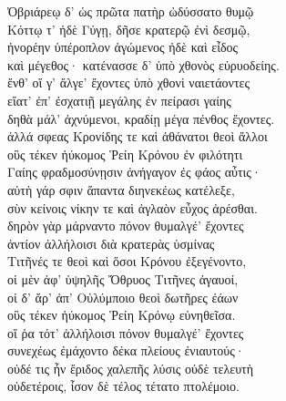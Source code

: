 \begin{pages}
\begin{Leftside}
\smallskip
\begin{center}\end{center}
\smallskip

Ὀβριάρεῳ δ' ὡς πρῶτα πατὴρ ὠδύσσατο θυμῷ \\
Κόττῳ τ' ἠδὲ Γύγῃ, δῆσε κρατερῷ ἐνὶ δεσμῷ, \\
ἠνορέην ὑπέροπλον ἀγώμενος ἠδὲ καὶ εἶδος\\
καὶ μέγεθος· κατένασσε δ' ὑπὸ χθονὸς εὐρυοδείης.  \\
ἔνθ' οἵ γ' ἄλγε' ἔχοντες ὑπὸ χθονὶ ναιετάοντες\\
εἵατ' ἐπ' ἐσχατιῇ μεγάλης ἐν πείρασι γαίης \\
δηθὰ μάλ' ἀχνύμενοι, κραδίῃ μέγα πένθος ἔχοντες.\\
ἀλλά σφεας Κρονίδης τε καὶ ἀθάνατοι θεοὶ ἄλλοι \\
οὓς τέκεν ἠύκομος Ῥείη Κρόνου ἐν φιλότητι  \\
Γαίης φραδμοσύνῃσιν ἀνήγαγον ἐς φάος αὖτις· \\
αὐτὴ γάρ σφιν ἅπαντα διηνεκέως κατέλεξε, \\
σὺν κείνοις νίκην τε καὶ ἀγλαὸν εὖχος ἀρέσθαι.\\
δηρὸν γὰρ μάρναντο πόνον θυμαλγέ' ἔχοντες\\
ἀντίον ἀλλήλοισι διὰ κρατερὰς ὑσμίνας   \\
Τιτῆνές τε θεοὶ καὶ ὅσοι Κρόνου ἐξεγένοντο, \\
οἱ μὲν ἀφ' ὑψηλῆς Ὄθρυος Τιτῆνες ἀγαυοί,  \\
οἱ δ' ἄρ' ἀπ' Οὐλύμποιο θεοὶ δωτῆρες ἐάων \\
οὓς τέκεν ἠύκομος Ῥείη Κρόνῳ εὐνηθεῖσα.\\
οἵ ῥα τότ' ἀλλήλοισι πόνον θυμαλγέ' ἔχοντες  \\
συνεχέως ἐμάχοντο δέκα πλείους ἐνιαυτούς· \\
οὐδέ τις ἦν ἔριδος χαλεπῆς λύσις οὐδὲ τελευτὴ\\
οὐδετέροις, ἶσον δὲ τέλος τέτατο πτολέμοιο.\\


\end{Leftside}
\end{pages}
